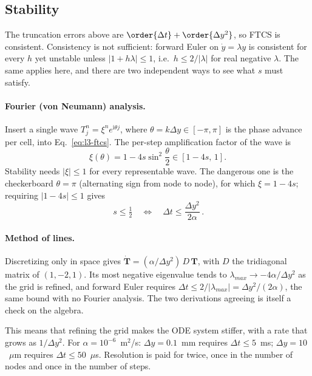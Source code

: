 \subsection{Stability}
\label{sec:l3-fd-stab}

The truncation errors above are $\order{\Delta t}+\order{\Delta y^2}$, so FTCS is consistent. Consistency is not sufficient: forward Euler on $\dot y=\lambda y$ is consistent for every $h$ yet unstable unless $|1+h\lambda|\le1$, i.e.\ $h\le2/|\lambda|$ for real negative $\lambda$. The same applies here, and there are two independent ways to see what $s$ must satisfy.

\paragraph{Fourier (von Neumann) analysis.} Insert a single wave $T_j^n=\xi^n e^{\mathrm{i}\theta j}$, where $\theta=k\Delta y\in[-\pi,\pi]$ is the phase advance per cell, into Eq.~\eqref{eq:l3-ftcs}. The per-step amplification factor of the wave is
\begin{equation}
\xi(\theta)=1-4s\sin^2\!\frac{\theta}{2}\in[1-4s,\,1].
\label{eq:l3-vn}
\end{equation}
Stability needs $|\xi|\le1$ for every representable wave. The dangerous one is the checkerboard $\theta=\pi$ (alternating sign from node to node), for which $\xi=1-4s$; requiring $|1-4s|\le1$ gives
\begin{equation}
\boxed{\,s\le\tfrac12\quad\Longleftrightarrow\quad\Delta t\le\frac{\Delta y^2}{2\alpha}\,}.
\label{eq:l3-bound}
\end{equation}

\paragraph{Method of lines.} Discretizing only in space gives $\dot{\mathbf T}=(\alpha/\Delta y^2)\,D\,\mathbf T$, with $D$ the tridiagonal matrix of $(1,-2,1)$. Its most negative eigenvalue tends to $\lambda_{max}\to-4\alpha/\Delta y^2$ as the grid is refined, and forward Euler requires $\Delta t\le2/|\lambda_{max}|=\Delta y^2/(2\alpha)$, the same bound with no Fourier analysis. The two derivations agreeing is itself a check on the algebra.

This means that refining the grid makes the ODE system stiffer, with a rate that grows as $1/\Delta y^2$. For $\alpha=10^{-6}$~m$^2$/s: $\Delta y=0.1$~mm requires $\Delta t\le5$~ms; $\Delta y=10$~$\mu$m requires $\Delta t\le50$~$\mu$s. Resolution is paid for twice, once in the number of nodes and once in the number of steps.

